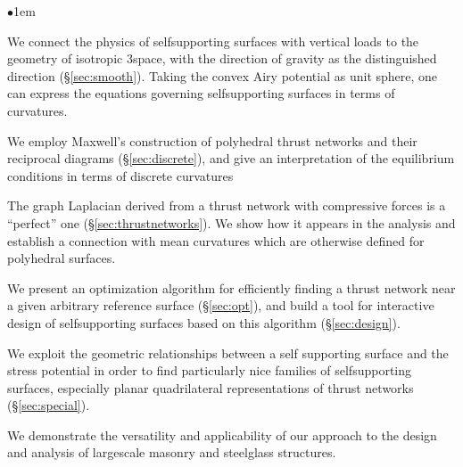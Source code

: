 \documentclass[review]{acmsiggraph}
\newcommand{\secref}[1]{(\S\ref{#1})}
\begin{document}
\begin{list}{$\bullet$}{\itemindent1em}

\item We connect the physics of self\dash supporting surfaces with 
vertical loads to the geometry of isotropic 3\dash space, with the 
direction of gravity as the distinguished direction \secref{sec:smooth}. 
Taking the convex Airy potential as unit sphere, one can express the 
equations governing self\dash supporting surfaces in terms of curvatures.


\item We employ Maxwell's construction of polyhedral thrust networks and 
their reciprocal diagrams \secref{sec:discrete}, and give an 
interpretation of the equilibrium conditions in terms of discrete 
curvatures

\item The graph Laplacian derived from a thrust network with compressive 
forces is a ``perfect'' one \secref{sec:thrustnetworks}.
We show how it appears in the analysis and 
establish a connection with mean curvatures which are otherwise defined 
for polyhedral surfaces.


\item We present an optimization algorithm for efficiently finding a 
thrust network near a given arbitrary reference surface \secref{sec:opt}, 
and build a tool for interactive design of self\dash supporting surfaces 
based on this algorithm \secref{sec:design}.

\item We exploit the geometric relationships between a self\dash 
supporting surface and the stress potential in order to find particularly 
nice families of self\dash supporting surfaces, especially planar 
quadrilateral representations of thrust networks \secref{sec:special}.

\item We demonstrate the versatility and applicability of our approach to 
the design and analysis of large\dash scale masonry and steel\dash glass 
structures.

\end{list}
\end{document}
